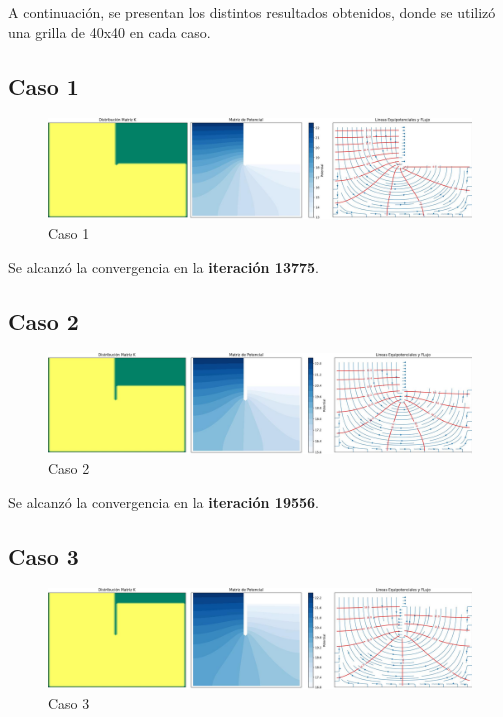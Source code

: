 A continuación, se presentan los distintos resultados obtenidos, donde se utilizó una grilla de 40x40 en cada caso.

\subsection{Caso 1}

\begin{figure}[H]
    \centering
    \includegraphics[width=1\textwidth]{GRAFICOS/laplace_caso_1.jpg}
    \caption{Caso 1}
    \label{fig:caso_1}
\end{figure}

Se alcanzó la convergencia en la \textbf{iteración 13775}.

\subsection{Caso 2}

\begin{figure}[H]
    \centering
    \includegraphics[width=1\textwidth]{GRAFICOS/laplace_caso_2.jpg}
    \caption{Caso 2}
    \label{fig:caso_2}
\end{figure}

Se alcanzó la convergencia en la \textbf{iteración 19556}.

\subsection{Caso 3}

\begin{figure}[H]
    \centering
    \includegraphics[width=1\textwidth]{GRAFICOS/laplace_caso_3.jpg}
    \caption{Caso 3}
    \label{fig:caso_3}
\end{figure}

